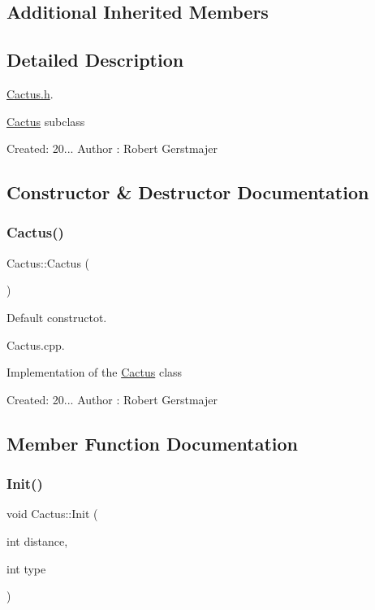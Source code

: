 \subsection*{Additional Inherited Members}


\subsection{Detailed Description}
\mbox{\hyperlink{_cactus_8h_source}{Cactus.\+h}}. 

\mbox{\hyperlink{class_cactus}{Cactus}} subclass

Created\+: 20... Author \+: Robert Gerstmajer 

\subsection{Constructor \& Destructor Documentation}
\mbox{\label{class_cactus_a7af2b09f8e3efd82ee3d5dc1b5ad24d7}} 
\subsubsection{\texorpdfstring{Cactus()}{Cactus()}}
{\footnotesize\ttfamily Cactus\+::\+Cactus (\begin{DoxyParamCaption}{ }\end{DoxyParamCaption})}



Default constructot. 

Cactus.\+cpp.

Implementation of the \mbox{\hyperlink{class_cactus}{Cactus}} class

Created\+: 20... Author \+: Robert Gerstmajer 

\subsection{Member Function Documentation}
\mbox{\label{class_cactus_a44cd240a41740db3216ce9d18ea9a8aa}} 
\subsubsection{\texorpdfstring{Init()}{Init()}}
{\footnotesize\ttfamily void Cactus\+::\+Init (\begin{DoxyParamCaption}\item[{int}]{distance,  }\item[{int}]{type }\end{DoxyParamCaption})}



